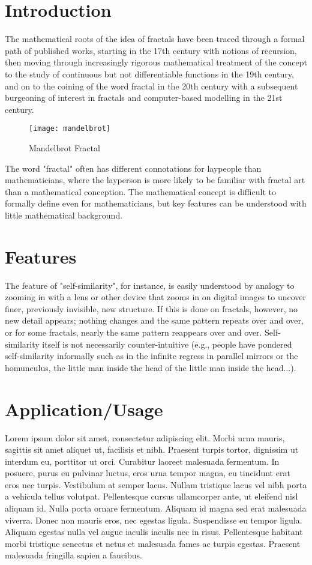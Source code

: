 \documentclass{fisattraining}
\begin{document}
\section{Introduction}
The mathematical roots of the idea of fractals have been traced through a formal path of published works, starting in the 17th century with notions of recursion, then moving through increasingly rigorous mathematical treatment of the concept to the study of continuous but not differentiable functions in the 19th century, and on to the coining of the word fractal in the 20th century with a subsequent burgeoning of interest in fractals and computer-based modelling in the 21st century.
\begin{figure}[h!]
\begin{center}
\texttt{[image: mandelbrot]}
\caption{Mandelbrot Fractal}
\end{center}
\end{figure}
The word "fractal" often has different connotations for laypeople than mathematicians, where the layperson is more likely to be familiar with fractal art than a mathematical conception. The mathematical concept is difficult to formally define even for mathematicians, but key features can be understood with little mathematical background.
\section{Features}
The feature of "self-similarity", for instance, is easily understood by analogy to zooming in with a lens or other device that zooms in on digital images to uncover finer, previously invisible, new structure. If this is done on fractals, however, no new detail appears; nothing changes and the same pattern repeats over and over, or for some fractals, nearly the same pattern reappears over and over. Self-similarity itself is not necessarily counter-intuitive (e.g., people have pondered self-similarity informally such as in the infinite regress in parallel mirrors or the homunculus, the little man inside the head of the little man inside the head...). 
\section{Application/Usage}
Lorem ipsum dolor sit amet, consectetur adipiscing elit. Morbi urna mauris, sagittis sit amet aliquet ut, facilisis et nibh. Praesent turpis tortor, dignissim ut interdum eu, porttitor ut orci. Curabitur laoreet malesuada fermentum. In posuere, purus eu pulvinar luctus, eros urna tempor magna, eu tincidunt erat eros nec turpis. Vestibulum at semper lacus. Nullam tristique lacus vel nibh porta a vehicula tellus volutpat. Pellentesque cursus ullamcorper ante, ut eleifend nisl aliquam id. Nulla porta ornare fermentum. Aliquam id magna sed erat malesuada viverra. Donec non mauris eros, nec egestas ligula. Suspendisse eu tempor ligula. Aliquam egestas nulla vel augue iaculis iaculis nec in risus. Pellentesque habitant morbi tristique senectus et netus et malesuada fames ac turpis egestas. Praesent malesuada fringilla sapien a faucibus.
\end{document}
